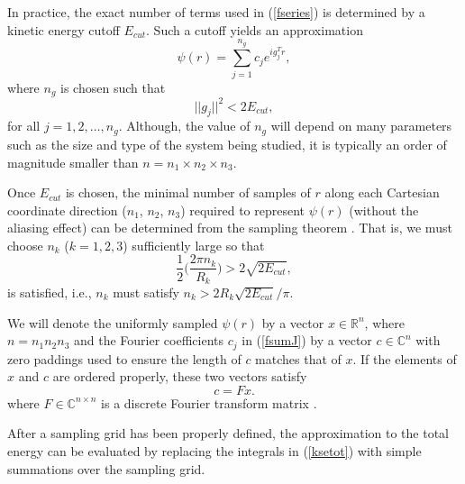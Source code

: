 \documentclass[11pt]{book}
\begin{document}
In practice, the exact number of terms used in (\ref{fseries}) is determined
by a kinetic energy cutoff $E_{cut}$. Such a cutoff yields an approximation
\begin{equation}
\psi(r) = \sum_{j=1}^{n_g} c_{j} e^{i g_j^T r}, 
\label{fsumJ}
\end{equation}
where $n_g$ is chosen such that 
\begin{equation}
||g_j ||^2 < 2 E_{cut},
\label{ecutoff}
\end{equation}
for all $j = 1,2, \ldots , n_g$.   
Although, the value of $n_g$ will depend on many parameters such as the size and type of the system being studied, it is typically an order of magnitude smaller than $n=n_1 \times n_2 \times n_3$. 

Once $E_{cut}$ is chosen, the minimal number of samples of $r$ along each 
Cartesian coordinate direction ($n_1$, $n_2$, $n_3$) required
to represent $\psi(r)$ (without the aliasing effect) can be determined from 
the sampling theorem \cite{nyquist}. That is, we must choose $n_k$ ($k=1,2,3$) 
sufficiently large so that
\begin{equation}
\frac{1}{2}\biggl(\frac{2\pi n_k}{R_k} \biggr) > 2 \sqrt{2E_{cut}}, \label{ecut2}
\end{equation}
is satisfied, i.e., $n_k$ must satisfy 
$n_k > 2R_k \sqrt{2E_{cut}} / \pi$.

We will denote the uniformly sampled $\psi(r)$ by a vector 
$x \in \mathbb{R}^n$, where $n = n_1n_2n_3$ and the Fourier coefficients $c_{j}$ 
in (\ref{fsumJ}) by a vector $c \in \mathbb{C}^{n}$ with zero paddings 
used to ensure the length of $c$ matches that of $x$. If the elements
of $x$ and $c$ are ordered properly, these two vectors satisfy
\begin{equation}
c = F x.  \label{x2c}
\end{equation}
where $F \in \mathbb{C}^{n \times n}$ is a discrete Fourier transform 
matrix \cite{vanloanbook}.

After a sampling grid has been properly defined, the approximation
to the total energy can be evaluated by replacing the integrals
in (\ref{ksetot}) with simple summations over the 
sampling grid.
\end{document}
